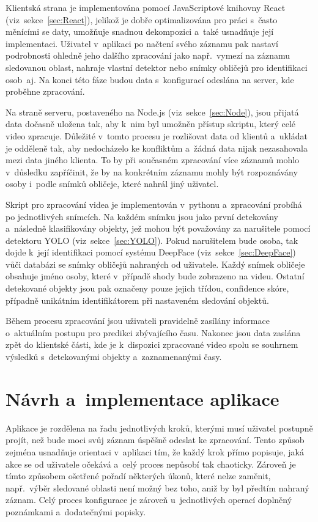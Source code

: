 Klientská strana je implementována pomocí JavaScriptové knihovny React (viz~sekce~\ref{sec:React}), jelikož je dobře optimalizována pro práci s~často měnícími se daty, umožňuje snadnou dekompozici a~také usnadňuje její implementaci. Uživatel v~aplikaci po načtení svého záznamu pak nastaví podrobnosti ohledně jeho dalšího zpracování jako např.~vymezí na záznamu sledovanou oblast, nahraje vlastní detektor nebo snímky obličejů pro identifikaci osob~aj. Na konci této fáze budou data s~konfigurací odeslána na server, kde proběhne zpracování.

Na straně serveru, postaveného na Node.js (viz~sekce~\ref{sec:Node}), jsou přijatá data dočasně uložena tak, aby k~nim byl umožněn přístup skriptu, který celé video zpracuje. Důležité v~tomto procesu je rozlišovat data od klientů a~ukládat je odděleně tak, aby nedocházelo ke konfliktům a~žádná data nijak nezasahovala mezi data jiného klienta. To by při současném zpracování více záznamů mohlo v~důsledku zapříčinit, že by na konkrétním záznamu mohly být rozpoznávány osoby i~podle snímků obličeje, které nahrál jiný uživatel.

Skript pro zpracování videa je implementován v~pythonu a~zpracování probíhá po jednotlivých snímcích. Na každém snímku jsou jako první detekovány a~následně klasifikovány objekty, jež mohou být považovány za narušitele pomocí detektoru YOLO (viz~sekce~\ref{sec:YOLO}). Pokud narušitelem bude osoba, tak dojde k~její identifikaci pomocí systému DeepFace (viz~sekce~\ref{sec:DeepFace}) vůči databázi se snímky obličejů nahraných od uživatele. Každý snímek obličeje obsahuje jméno osoby, které v~případě shody bude zobrazeno na videu. Ostatní detekované objekty jsou pak označeny pouze jejich třídou, confidence skóre, případně unikátním identifikátorem při nastaveném sledování objektů.

Během procesu zpracování jsou uživateli pravidelně zasílány informace o~aktuálním postupu pro predikci zbývajícího času. Nakonec jsou data zaslána zpět do klientské části, kde je k~dispozici zpracované video spolu se souhrnem výsledků s~detekovanými objekty a~zaznamenanými časy.

\section{Návrh a~implementace aplikace}
Aplikace je rozdělena na řadu jednotlivých kroků, kterými musí uživatel postupně projít, než bude moci svůj záznam úspěšně odeslat ke zpracování. Tento způsob zejména usnadňuje orientaci v~aplikaci tím, že každý krok přímo popisuje, jaká akce se od uživatele očekává a~celý proces nepůsobí tak chaoticky. Zároveň je tímto způsobem ošetřené pořadí některých úkonů, které nelze zaměnit, např.~výběr sledované oblasti není možný bez toho, aniž by byl předtím nahraný záznam. Celý proces konfigurace je zároveň u~jednotlivých operací doplněný poznámkami a~dodatečnými popisky.

